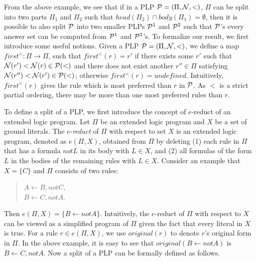 \documentclass{tlp}
\begin{document}
From the above example, we see that if in a PLP ${\cal P}=(\Pi, {\cal N}, <)$,
$\Pi$ can be split into two parts $\Pi_{1}$ and $\Pi_{2}$ such that
$head(\Pi_{2})\cap body(\Pi_{1})=\emptyset$, then it is possible to
also split ${\cal P}$ into two smaller PLPs
${\cal P}^{1}$ and ${\cal P}^{2}$ such that
${\cal P}$'s every answer set can be computed from ${\cal P}^{1}$ and ${\cal P}^{2}$'s.
To formalize our result, we first introduce some useful notions.
%
Given a PLP ${\cal P}=(\Pi,{\cal N},<)$,
we define a map $first^{<}: \Pi \longrightarrow \Pi$, such that
$first^{<}(r)=r'$ if there exists some
$r'$ such that ${\cal N}(r')<{\cal N}(r)\in {\cal P}(<)$ and there does not exist
another $r'' \in \Pi$ satisfying ${\cal N}(r'')<{\cal N}(r')\in {\cal P}(<)$;
otherwise $first^{<}(r)=undefined$.
Intuitively, $first^{<}(r)$ gives the rule which is most preferred than $r$
in ${\cal P}$. As $<$ is a strict partial ordering,
there may be more than one most preferred rules than $r$.

To define a split of a PLP, we first introduce the concept of $e$-reduct of 
an extended logic program. Let $\Pi$ be an extended logic 
program and $X$ be a set of ground literals.
The $e$-{\em reduct} of $\Pi$
with respect to set $X$ is an extended logic program, denoted as $e(\Pi,X)$, 
obtained from $\Pi$ by deleting (1) each rule in $\Pi$ that has 
a formula $not L$ in its body with $L\in X$, and (2) all
formulas of the form $L$ in the bodies of the remaining rules with $L\in X$.
%
Consider an example that $X=\{C\}$ and $\Pi$ consists of two rules:
\begin{quote}
$A\leftarrow B, not C$,\\
\hspace*{.1in} $B\leftarrow C, not A$.
\end{quote}
Then $e(\Pi,X)=\{B\leftarrow not A\}$. Intuitively, the $e$-reduct
of $\Pi$ with respect to $X$ can be viewed as a simplified 
program of $\Pi$ given the fact that every literal in $X$ is true.
For a
rule $r\in e(\Pi,X)$, we use
$original(r)$ to denote $r$'s original form in $\Pi$.
In the above example, it is easy to see that
$original(B\leftarrow not A)$ is $B\leftarrow C, not A$.
Now a split of a PLP can be formally defined as follows.
\end{document}
